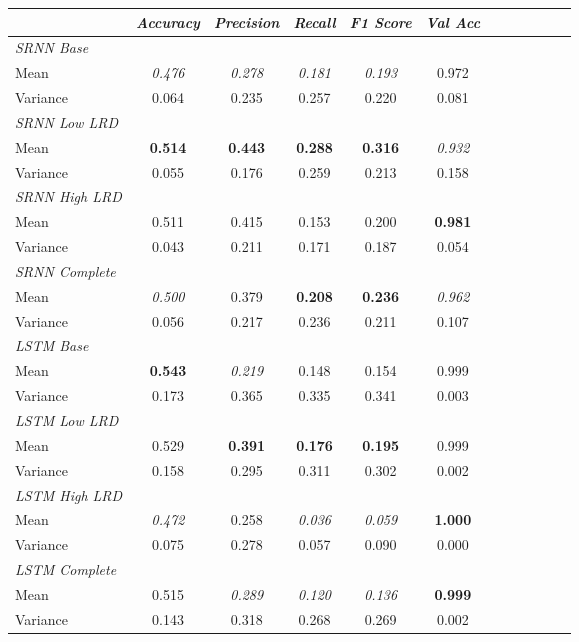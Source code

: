 \begin{table}
\begin{tabularx}{\textwidth}{@{}l*{10}{C}c@{}}
 \toprule
  & \textit{Accuracy} &  \textit{Precision} &  \textit{Recall} &  \textit{F1 Score} &  \textit{Val Acc} \\
 \midrule
 \textit{SRNN Base} \\
	Mean & \textit{0.476} & \textit{0.278} & \textit{0.181} & \textit{0.193} & 0.972 \\
	Variance & 0.064 & 0.235 & 0.257 & 0.220 & 0.081 \\
 \midrule
 \textit{SRNN Low LRD} \\
	Mean & \textbf{0.514} & \textbf{0.443} & \textbf{0.288} & \textbf{0.316} & \textit{0.932} \\
	Variance & 0.055 & 0.176 & 0.259 & 0.213 & 0.158 \\
 \midrule
 \textit{SRNN High LRD} \\
	Mean & 0.511 & 0.415 & 0.153 & 0.200 & \textbf{0.981} \\
	Variance & 0.043 & 0.211 & 0.171 & 0.187 & 0.054 \\
 \midrule
 \textit{SRNN Complete} \\
	Mean & \textit{0.500} & 0.379 & \textbf{0.208} & \textbf{0.236} & \textit{0.962} \\
	Variance & 0.056 & 0.217 & 0.236 & 0.211 & 0.107 \\
 \midrule
 \midrule
 \textit{LSTM Base} \\
 Mean & \textbf{0.543} & \textit{0.219} & 0.148 & 0.154 & 0.999 \\
Variance & 0.173 & 0.365 & 0.335 & 0.341 & 0.003 \\
 \midrule
 \textit{LSTM Low LRD} \\
 Mean & 0.529 & \textbf{0.391} & \textbf{0.176} & \textbf{0.195} & 0.999 \\
Variance & 0.158 & 0.295 & 0.311 & 0.302 & 0.002 \\
 \midrule
 \textit{LSTM High LRD} \\
 Mean & \textit{0.472} & 0.258 & \textit{0.036} & \textit{0.059} & \textbf{1.000} \\
Variance & 0.075 & 0.278 & 0.057 & 0.090 & 0.000 \\
 \midrule
 \textit{LSTM Complete} \\
Mean & 0.515 & \textit{0.289} & \textit{0.120} & \textit{0.136} & \textbf{0.999} \\
Variance & 0.143 & 0.318 & 0.268 & 0.269 & 0.002 \\

\end{tabularx}
\end{table}
